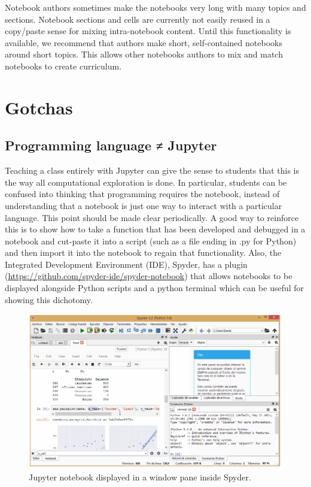 \documentclass[]{book}
\begin{document}
Notebook authors sometimes make the notebooks very long with many topics
and sections. Notebook sections and cells are currently not easily
reused in a copy/paste sense for mixing intra-notebook content. Until
this functionality is available, we recommend that authors make short,
self-contained notebooks around short topics. This allows other
notebooks authors to mix and match notebooks to create curriculum.

\section{Gotchas}\label{gotchas}

\subsection{Programming language ≠
Jupyter}\label{programming-language-jupyter}

Teaching a class entirely with Jupyter can give the sense to students
that this is the way all computational exploration is done. In
particular, students can be confused into thinking that programming
requires the notebook, instead of understanding that a notebook is just
one way to interact with a particular language. This point should be
made clear periodically. A good way to reinforce this is to show how to
take a function that has been developed and debugged in a notebook and
cut-paste it into a script (such as a file ending in .py for Python) and
then import it into the notebook to regain that functionality. Also, the
Integrated Development Environment (IDE), Spyder, has a plugin
(\url{https://github.com/spyder-ide/spyder-notebook}) that allows
notebooks to be displayed alongside Python scripts and a python terminal
which can be useful for showing this dichotomy.

\begin{figure}
\centering
\includegraphics{images/chapter54.png}
\caption{Jupyter notebook displayed in a window pane inside Spyder.}
\end{figure}
\end{document}
